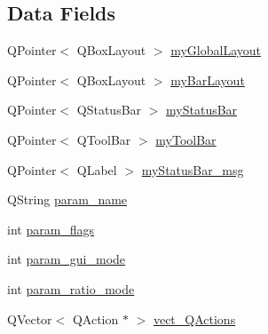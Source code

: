 \subsection*{Data Fields}
\begin{DoxyCompactItemize}
\item 
Q\-Pointer$<$ Q\-Box\-Layout $>$ \hyperlink{classCvWindow_a706d24419e22947d0fcdcef9d3194605}{my\-Global\-Layout}
\item 
Q\-Pointer$<$ Q\-Box\-Layout $>$ \hyperlink{classCvWindow_a1c1ba7aa00c19ca8a99da650f8bd6fb1}{my\-Bar\-Layout}
\item 
Q\-Pointer$<$ Q\-Status\-Bar $>$ \hyperlink{classCvWindow_ad21a9548c597a6651b73d41a3383a1d3}{my\-Status\-Bar}
\item 
Q\-Pointer$<$ Q\-Tool\-Bar $>$ \hyperlink{classCvWindow_a147b82422fa5d532192990f77e6ae2d8}{my\-Tool\-Bar}
\item 
Q\-Pointer$<$ Q\-Label $>$ \hyperlink{classCvWindow_a62c523f9df3830591bcbb44145c85db4}{my\-Status\-Bar\-\_\-msg}
\item 
Q\-String \hyperlink{classCvWindow_a2f2e2a14703dbe479049862f5f43ac13}{param\-\_\-name}
\item 
int \hyperlink{classCvWindow_ae79962eeb12c2dbcedafb23362ba1847}{param\-\_\-flags}
\item 
int \hyperlink{classCvWindow_a1503f81d43bec919c329a1c98cb3f559}{param\-\_\-gui\-\_\-mode}
\item 
int \hyperlink{classCvWindow_a9d97fe990d3fb23daa031ac39483b059}{param\-\_\-ratio\-\_\-mode}
\item 
Q\-Vector$<$ Q\-Action $\ast$ $>$ \hyperlink{classCvWindow_a55d09660aba2ef83bf2eaa4fe80bb746}{vect\-\_\-\-Q\-Actions}
\end{DoxyCompactItemize}



